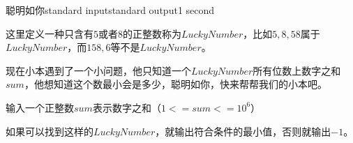 \begin{problem}{聪明如你}{standard input}{standard output}{1 second}

这里定义一种只含有$5$或者$8$的正整数称为$Lucky Number$，比如$5,8,58$属于$Lucky Number$，而$158,6$等不是$Lucky Number$。

现在小本遇到了一个小问题，他只知道一个$Lucky Number$所有位数上数字之和$sum$，他想知道这个数最小会是多少，聪明如你，快来帮帮我们的小本吧。

\InputFile

输入一个正整数$sum$表示数字之和（$1<=sum<=10^6$）

\OutputFile

如果可以找到这样的$Lucky Number$，就输出符合条件的最小值，否则就输出$-1$。

\Example

\begin{example}
%
%
%
\end{example}
\end{problem}
